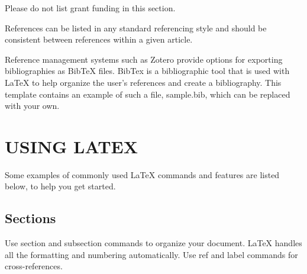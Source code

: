 \documentclass[10pt,a4paper,twocolumn]{article}
\begin{document}
Please do not list grant funding in this section.


\nocite{*}
{\small
}


References can be listed in any standard referencing style and should be consistent between references within a given article.

Reference management systems such as Zotero provide options for exporting bibliographies as BibTeX files. BibTex is a bibliographic tool that is used with LaTeX to help organize the user's references and create a bibliography. This template contains an example of such a file, sample.bib, which can be replaced with your own. 


\section*{USING LATEX}
Some examples of commonly used \LaTeX{}  commands and features are listed below, to help you get started.


\subsection*{Sections}

Use section and subsection commands to organize your document. \LaTeX{} handles all the formatting and numbering automatically. Use ref and label commands for cross-references.









\end{document}
